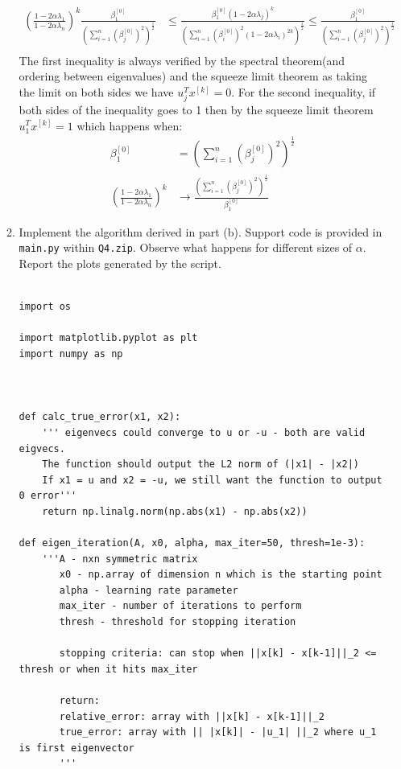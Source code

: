 \documentclass[12pt,twoside]{article}
\begin{document}
\begin{enumerate}
\begin{enumerate}
\begin{align*}
	(\frac{1-2 \alpha \lambda_1}{1-2 \alpha \lambda_n})^k \frac{\beta_1^{[0]}} {(\sum_{i=1}^n (\beta_j^{[0]})^2)^{\frac{1}{2}}} 
		&\le \frac{ \beta_1^{[0]} (1 - 2 \alpha \lambda_j)^k }  { (\sum_{i=1}^n (\beta_i^{[0]})^2 (1 - 2 \alpha \lambda_i)^{2k} )^{\frac{1}{2}} } 
		\le \frac{\beta_1^{[0]}} {(\sum_{i=1}^n (\beta_j^{[0]})^2)^{\frac{1}{2}}} \\
\end{align*}
The first inequality is always verified by the spectral theorem(and ordering between eigenvalues) and the squeeze limit theorem as taking the limit on both sides we have $u_j^T x^{[k]} = 0$.
For the second inequality, if both sides of the inequality goes to 1 then by the squeeze limit theorem $u_1^T x^{[k]}  = 1$ which happens when:
\begin{align*}
	\beta_1^{[0]}										&= 	(\sum_{i=1}^n (\beta_j^{[0]})^2)^{\frac{1}{2}} \\
	(\frac{1-2 \alpha \lambda_1}{1-2 \alpha \lambda_n})^k		&\to \frac{ (\sum_{i=1}^n (\beta_j^{[0]})^2)^{\frac{1}{2}} } {\beta_1^{[0]}}  
\end{align*}

\item Implement the algorithm derived in part (b). Support code is provided in {\tt main.py} within {\tt Q4.zip}. Observe what happens for different sizes of $\alpha$. Report the plots generated by the script.

\begin{verbatim}

import os

import matplotlib.pyplot as plt
import numpy as np



def calc_true_error(x1, x2):
    ''' eigenvecs could converge to u or -u - both are valid eigvecs.
    The function should output the L2 norm of (|x1| - |x2|)
    If x1 = u and x2 = -u, we still want the function to output 0 error'''
    return np.linalg.norm(np.abs(x1) - np.abs(x2))
    
def eigen_iteration(A, x0, alpha, max_iter=50, thresh=1e-3):
    '''A - nxn symmetric matrix
       x0 - np.array of dimension n which is the starting point
       alpha - learning rate parameter
       max_iter - number of iterations to perform
       thresh - threshold for stopping iteration
       
       stopping criteria: can stop when ||x[k] - x[k-1]||_2 <= thresh or when it hits max_iter
       
       return: 
       relative_error: array with ||x[k] - x[k-1]||_2  
       true_error: array with || |x[k]| - |u_1| ||_2 where u_1 is first eigenvector
       '''


\end{verbatim}
\end{enumerate}
\end{enumerate}
\end{document}
